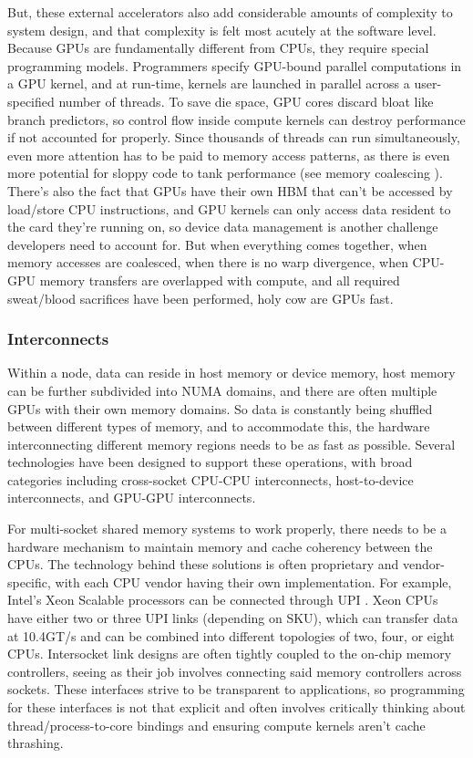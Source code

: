 But, these external accelerators also add considerable amounts of complexity to system design, and that complexity is felt most acutely at the software level.  
Because GPUs are fundamentally different from CPUs, they require special programming models.
Programmers specify GPU-bound parallel computations in a GPU kernel, and at run-time, kernels are launched in parallel across a user-specified number of threads.
To save die space, GPU cores discard bloat like branch predictors, so control flow inside compute kernels can destroy performance if not accounted for properly.
Since thousands of threads can run simultaneously, even more attention has to be paid to memory access patterns, as there is even more potential  for sloppy code to tank performance (see memory coalescing \cite{CUDAMemCoalescing}).
There's also the fact that GPUs have their own HBM that can't be accessed by load/store CPU instructions, and GPU kernels can only access data resident to the card they're running on, so device data management is another challenge developers need to account for. 
But when everything comes together, when memory accesses are coalesced, when there is no warp divergence, when CPU-GPU memory transfers are overlapped with compute, and all required sweat/blood sacrifices have been performed, holy cow are GPUs fast.

\subsubsection{Interconnects}
Within a node, data can reside in host memory or device memory, host memory can be further subdivided into NUMA domains, and there are often multiple GPUs with their own memory domains.
So data is constantly being shuffled between different types of memory, and to accommodate this, the hardware interconnecting different memory regions needs to be as fast as possible.
Several technologies have been designed to support these operations, with broad categories including cross-socket CPU-CPU interconnects, host-to-device interconnects, and  GPU-GPU  interconnects.

For multi-socket shared memory systems to work properly, there needs to be a hardware mechanism to maintain memory and cache coherency between the CPUs.  
The technology behind these solutions is often proprietary and vendor-specific, with each CPU vendor having their own implementation.
For example, Intel's Xeon Scalable processors can be connected through UPI \cite{XeonTechOverview}.
Xeon CPUs have either two or three UPI links (depending on SKU), which can transfer data at 10.4GT/s and can be combined into different topologies of two, four, or eight CPUs.
Intersocket link designs are often tightly coupled to the on-chip memory controllers, seeing as their job involves connecting said memory controllers across sockets.
These interfaces strive to be transparent to applications, so programming for these interfaces is not that explicit and often involves critically thinking about thread/process-to-core bindings and ensuring compute kernels aren't cache thrashing.

